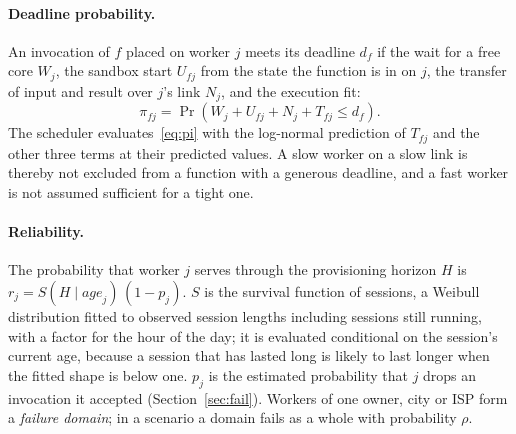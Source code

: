 \paragraph{Deadline probability.}
An invocation of $f$ placed on worker $j$ meets its deadline $d_f$ if the wait for a free core $W_j$, the sandbox
start $U_{fj}$ from the state the function is in on $j$, the transfer of input and result over $j$'s link $N_j$, and
the execution fit:
\begin{equation}
\pi_{fj} = \Pr\left( W_j + U_{fj} + N_j + T_{fj} \le d_f \right).
\label{eq:pi}
\end{equation}
The scheduler evaluates~\eqref{eq:pi} with the log-normal prediction of $T_{fj}$ and the other three terms at their
predicted values. A slow worker on a slow link is thereby not excluded from a function with a generous deadline, and a
fast worker is not assumed sufficient for a tight one.

\paragraph{Reliability.}
The probability that worker $j$ serves through the provisioning horizon $H$ is
$r_j = S(H \mid \mathit{age}_j)\,(1-p_j)$. $S$ is the survival function of sessions, a Weibull distribution fitted
to observed session lengths including sessions still running, with a factor for the hour of the day; it is evaluated
conditional on the session's current age, because a session that has lasted long is likely to last longer when the
fitted shape is below one. $p_j$ is the estimated probability that $j$ drops an invocation it accepted
(Section~\ref{sec:fail}). Workers of one owner, city or ISP form a \emph{failure domain}; in a scenario a domain fails as a
whole with probability $\rho$. 

